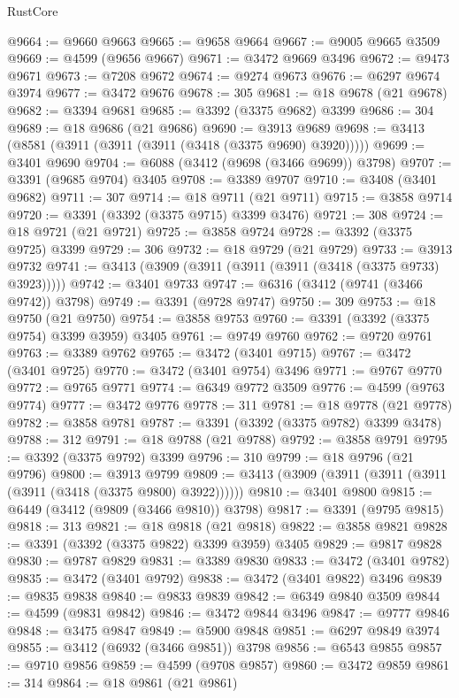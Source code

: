\begin{lexlean}{RustCore}
\begin{coremodule}
@9664 := @9660 @9663
@9665 := @9658 @9664
@9667 := @9005 @9665 @3509
@9669 := @4599 (@9656 @9667)
@9671 := @3472 @9669 @3496
@9672 := @9473 @9671
@9673 := @7208 @9672
@9674 := @9274 @9673
@9676 := @6297 @9674 @3974
@9677 := @3472 @9676
@9678 := 305
@9681 := @18 @9678 (@21 @9678)
@9682 := @3394 @9681
@9685 := @3392 (@3375 @9682) @3399
@9686 := 304
@9689 := @18 @9686 (@21 @9686)
@9690 := @3913 @9689
@9698 := @3413 (@8581 (@3911 (@3911 (@3911 (@3418 (@3375 @9690) @3920)))))
@9699 := @3401 @9690
@9704 := @6088 (@3412 (@9698 (@3466 @9699)) @3798)
@9707 := @3391 (@9685 @9704) @3405
@9708 := @3389 @9707
@9710 := @3408 (@3401 @9682)
@9711 := 307
@9714 := @18 @9711 (@21 @9711)
@9715 := @3858 @9714
@9720 := @3391 (@3392 (@3375 @9715) @3399 @3476)
@9721 := 308
@9724 := @18 @9721 (@21 @9721)
@9725 := @3858 @9724
@9728 := @3392 (@3375 @9725) @3399
@9729 := 306
@9732 := @18 @9729 (@21 @9729)
@9733 := @3913 @9732
@9741 := @3413 (@3909 (@3911 (@3911 (@3911 (@3418 (@3375 @9733) @3923)))))
@9742 := @3401 @9733
@9747 := @6316 (@3412 (@9741 (@3466 @9742)) @3798)
@9749 := @3391 (@9728 @9747)
@9750 := 309
@9753 := @18 @9750 (@21 @9750)
@9754 := @3858 @9753
@9760 := @3391 (@3392 (@3375 @9754) @3399 @3959) @3405
@9761 := @9749 @9760
@9762 := @9720 @9761
@9763 := @3389 @9762
@9765 := @3472 (@3401 @9715)
@9767 := @3472 (@3401 @9725)
@9770 := @3472 (@3401 @9754) @3496
@9771 := @9767 @9770
@9772 := @9765 @9771
@9774 := @6349 @9772 @3509
@9776 := @4599 (@9763 @9774)
@9777 := @3472 @9776
@9778 := 311
@9781 := @18 @9778 (@21 @9778)
@9782 := @3858 @9781
@9787 := @3391 (@3392 (@3375 @9782) @3399 @3478)
@9788 := 312
@9791 := @18 @9788 (@21 @9788)
@9792 := @3858 @9791
@9795 := @3392 (@3375 @9792) @3399
@9796 := 310
@9799 := @18 @9796 (@21 @9796)
@9800 := @3913 @9799
@9809 := @3413 (@3909 (@3911 (@3911 (@3911 (@3911 (@3418 (@3375 @9800) @3922))))))
@9810 := @3401 @9800
@9815 := @6449 (@3412 (@9809 (@3466 @9810)) @3798)
@9817 := @3391 (@9795 @9815)
@9818 := 313
@9821 := @18 @9818 (@21 @9818)
@9822 := @3858 @9821
@9828 := @3391 (@3392 (@3375 @9822) @3399 @3959) @3405
@9829 := @9817 @9828
@9830 := @9787 @9829
@9831 := @3389 @9830
@9833 := @3472 (@3401 @9782)
@9835 := @3472 (@3401 @9792)
@9838 := @3472 (@3401 @9822) @3496
@9839 := @9835 @9838
@9840 := @9833 @9839
@9842 := @6349 @9840 @3509
@9844 := @4599 (@9831 @9842)
@9846 := @3472 @9844 @3496
@9847 := @9777 @9846
@9848 := @3475 @9847
@9849 := @5900 @9848
@9851 := @6297 @9849 @3974
@9855 := @3412 (@6932 (@3466 @9851)) @3798
@9856 := @6543 @9855
@9857 := @9710 @9856
@9859 := @4599 (@9708 @9857)
@9860 := @3472 @9859
@9861 := 314
@9864 := @18 @9861 (@21 @9861)

\end{coremodule}
\end{lexlean}
